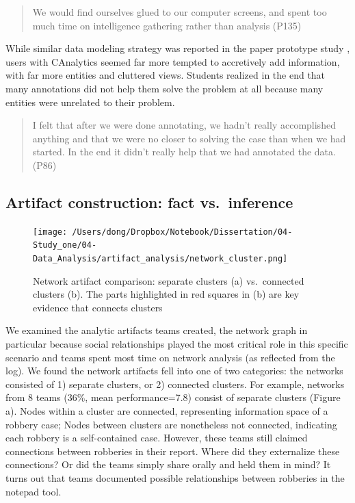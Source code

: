 \begin{quote}
We would find ourselves glued to our computer screens, and spent too
much time on intelligence gathering rather than analysis (P135)
\end{quote}

While similar data modeling strategy was reported in the paper prototype
study \autocite{Carroll2013}, users with CAnalytics seemed far more
tempted to accretively add information, with far more entities and
cluttered views. Students realized in the end that many annotations did
not help them solve the problem at all because many entities were
unrelated to their problem.

\begin{quote}
I felt that after we were done annotating, we hadn't really accomplished
anything and that we were no closer to solving the case than when we had
started. In the end it didn't really help that we had annotated the
data. (P86)
\end{quote}

\subsection{Artifact construction: fact
vs.~inference}\label{artifact-construction-fact-vs.inference}

\begin{figure}
\centering
\texttt{[image: /Users/dong/Dropbox/Notebook/Dissertation/04-Study\_one/04-Data\_Analysis/artifact\_analysis/network\_cluster.png]}
\caption{Network artifact comparison: separate clusters (a)
vs.~connected clusters (b). The parts highlighted in red squares in (b) are key
evidence that connects clusters\label{fig:network_cluster}}
\end{figure}

We examined the analytic artifacts teams created, the network
graph in particular because social relationships played the most
critical role in this specific scenario and teams spent most time on
network analysis (as reflected from the log). We found the network
artifacts fell into one of two categories: the networks consisted of 1)
separate clusters, or 2) connected clusters. For example, networks from
8 teams (36\%, mean performance=7.8) consist of separate clusters
(Figure \autocite{fig:network_cluster}a). Nodes within a cluster are
connected, representing information space of a robbery case; Nodes
between clusters are nonetheless not connected, indicating each robbery
is a self-contained case. However, these teams still claimed connections
between robberies in their report. Where did they externalize these
connections? Or did the teams simply share orally and held them in mind?
It turns out that teams documented possible relationships between
robberies in the notepad tool.

